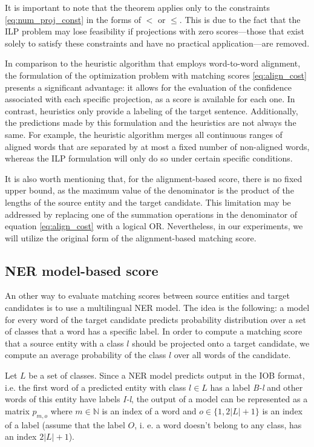 It is important to note that the theorem applies only to the constraints
\eqref{eq:num_proj_const} in the forms of \( < \) or \( \leq \). This is due to
the fact that the ILP problem may lose feasibility if projections with zero
scores—those that exist solely to satisfy these constraints and have no practical
application—are removed.

In comparison to the heuristic algorithm that employs word-to-word alignment,
the formulation of the optimization problem with matching scores \eqref{eq:align_cost}
presents a significant advantage: it allows for the evaluation of the confidence
associated with each specific projection, as a score is available for each one.
In contrast, heuristics only provide a labeling of the target sentence. Additionally,
the predictions made by this formulation and the heuristics are not always the same.
For example, the heuristic algorithm merges all continuous ranges of aligned words
that are separated by at most a fixed number of non-aligned words, whereas the
ILP formulation will only do so under certain specific conditions.

It is also worth mentioning that, for the alignment-based score, there is no fixed
upper bound, as the maximum value of the denominator is the product of the lengths of
the source entity and the target candidate. This limitation may be addressed by
replacing one of the summation operations in the denominator of equation
\eqref{eq:align_cost} with a logical OR. Nevertheless, in our experiments, we will
utilize the original form of the alignment-based matching score.

\subsection{NER model-based score}

An other way to evaluate matching scores between source entities and target candidates is to
use a multilingual NER model. The idea is the following: a model for every word of the target candidate
predicts probability distribution over a set of classes that a word has a specific label. In order to compute
a matching score that a source entity with a class \( l \) should be projected onto a target candidate,
we compute an average probability of the class \( l \) over all words of the candidate.

Let \( L \) be a set of classes. Since a NER model predicts output in the IOB format, i.e. the first word of a predicted
entity with class \( l \in L \) has a label \textit{B-l} and other words of this entity have labels \textit{I-l},
the output of a model can be represented as a matrix \( p_{m, o} \) where \( m \in \mathbb{N} \) is an index of a word and
\( o \in \{ 1, 2|L| + 1 \} \) is an index of a label (assume that the label \( O \), i. e. a word doesn't belong to any class,
has an index \( 2|L| + 1 \)).


